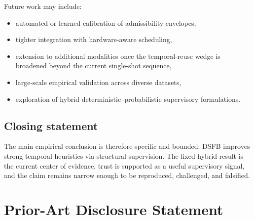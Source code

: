 \documentclass[11pt]{article}
\theoremstyle{definition}
\theoremstyle{plain}
\begin{document}
Future work may include:

\begin{itemize}[leftmargin=1.5em]
    \item automated or learned calibration of admissibility envelopes,
    \item tighter integration with hardware-aware scheduling,
    \item extension to additional modalities once the temporal-reuse wedge is broadened beyond the current single-shot sequence,
    \item large-scale empirical validation across diverse datasets,
    \item exploration of hybrid deterministic–probabilistic supervisory formulations.
\end{itemize}


\subsection{Closing statement}

The main empirical conclusion is therefore specific and bounded: DSFB improves strong temporal heuristics via structural supervision. The fixed hybrid result is the current center of evidence, trust is supported as a useful supervisory signal, and the claim remains narrow enough to be reproduced, challenged, and falsified.



\section*{Prior-Art Disclosure Statement}
\end{document}

